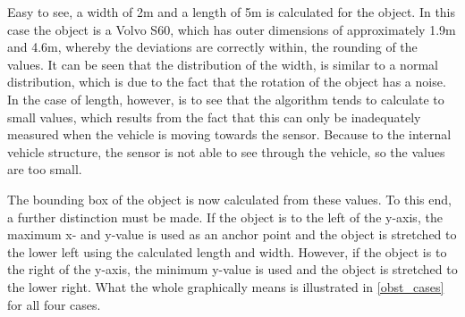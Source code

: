 \documentclass[11pt,oneside,openright]{mpreport}
\begin{document}

Easy to see, a width of 2m and a length of 5m is calculated for the object. In this case the object is a Volvo S60, which has outer dimensions of approximately
1.9m and 4.6m, whereby the deviations are correctly within, the rounding of the values. 
It can be seen that the distribution of the width, is similar to a normal distribution, which is due to the fact that the rotation of the object has a noise.
In the case of length, however, is to see that the algorithm tends to calculate to small values, which results from the fact that this can only be inadequately
measured when the vehicle is moving towards the sensor. Because to the internal vehicle structure, the sensor is not able to see through the vehicle, so the
values are too small.


The bounding box of the object is now calculated from these values. To this end, a further distinction must be made.
If the object is to the left of the y-axis, the maximum x- and y-value is used as an anchor point and the object is stretched to the lower left using the calculated length and width.
However, if the object is to the right of the y-axis, the minimum y-value is used and the object is stretched to the lower right. 
What the whole graphically means is illustrated in \cref{obst_cases} for all four cases.
\end{document}
